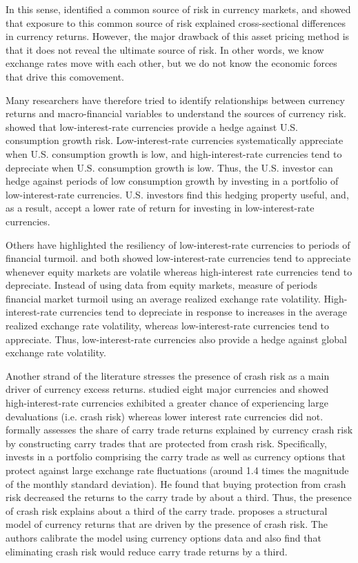 \documentclass{ar-1col}
\begin{document}
In this sense, \citet{LustigRoussanovVerdelhan2011} identified a common source of risk in currency markets, and showed that exposure to this common source of risk explained cross-sectional differences in currency returns. However, the major drawback of this asset pricing method is that it does not reveal the ultimate source of risk. In other words, we know exchange rates move with each other, but we do not know the economic forces that drive this comovement.

Many researchers have therefore tried to identify relationships between currency returns and macro-financial variables to understand the sources of currency risk. \citet{LustigVerdelhan2007} showed that low-interest-rate currencies provide a hedge against U.S. consumption growth risk. Low-interest-rate currencies systematically appreciate when U.S. consumption growth is low, and high-interest-rate currencies tend to depreciate when U.S. consumption growth is low. Thus, the U.S. investor can hedge against periods of low consumption growth by investing in a portfolio of low-interest-rate currencies. U.S. investors find this hedging property useful, and, as a result, accept a lower rate of return for investing in low-interest-rate currencies.

Others have highlighted the resiliency of low-interest-rate currencies to periods of financial turmoil. \citet{LustigRoussanovVerdelhan2011} and \citet{CampbellMedeirosViceira2010} both showed low-interest-rate currencies tend to appreciate whenever equity markets are volatile whereas high-interest rate currencies tend to depreciate. Instead of using data from equity markets, \citet{Menkhoffetal2012} measure of periods financial market turmoil using an average realized exchange rate volatility. High-interest-rate currencies tend to depreciate in response to increases in the average realized exchange rate volatility, whereas low-interest-rate currencies tend to appreciate. Thus, low-interest-rate currencies also provide a hedge against global exchange rate volatility. 

Another strand of the literature stresses the presence of crash risk as a main driver of currency excess returns. \citet{Brunnermeieretal2009} studied eight major currencies and showed high-interest-rate currencies exhibited a greater chance of experiencing large devaluations (i.e. crash risk) whereas lower interest rate currencies did not. \citet{Jurek2014} formally assesses the share of carry trade returns explained by currency crash risk by constructing carry trades that are protected from crash risk. Specifically, \citet{Jurek2014} invests in a portfolio comprising the carry trade as well as currency options that protect against large exchange rate fluctuations (around 1.4 times the magnitude of the monthly standard deviation). He found that buying protection from crash risk decreased the returns to the carry trade by about a third. Thus, the presence of crash risk explains about a third of the carry trade. \citet{Farhietal2015} proposes a structural model of currency returns that are driven by the presence of crash risk. The authors calibrate the model using currency options data and also find that eliminating crash risk would reduce carry trade returns by a third.
\end{document}

